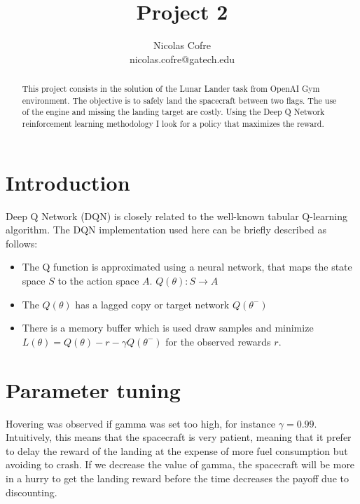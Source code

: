 \documentclass[11pt,en,bibstyle=ieeetr]{elegantpaper}
\title{Project 2}
\author{Nicolas Cofre \\ nicolas.cofre@gatech.edu}
\begin{document}
\maketitle

\begin{abstract}
This project consists in the solution of the Lunar Lander task from OpenAI Gym environment. The objective is to safely land the spacecraft between two flags. The use of the engine and missing the landing target are costly. Using the Deep Q Network reinforcement learning methodology I look for a policy that maximizes the reward.
\end{abstract}


\section{Introduction}


Deep Q Network (DQN) is closely related to the well-known tabular Q-learning algorithm. The DQN implementation used here can be briefly described as follows:
\begin{itemize}
\item The Q function is approximated using a neural network, that maps the state space $S$ to the action space $A$. $Q(\theta): S \to A$
\item  The $Q(\theta)$ has a lagged copy or target network $Q(\theta^-)$
\item  There is a memory buffer which is used draw samples and minimize  $L(\theta)=Q(\theta)-r-\gamma Q(\theta^-)$ for the observed rewards $r$.
\end{itemize}



\section{Parameter tuning}


Hovering was observed if gamma was set too high, for instance $\gamma=0.99$. Intuitively, this means that the spacecraft is very patient, meaning that it prefer to delay the reward of the landing at the expense of more fuel consumption but avoiding to crash. If we decrease the value of gamma, the spacecraft will be more in a hurry to get the landing reward before the time decreases the payoff due to discounting.
\end{document}
